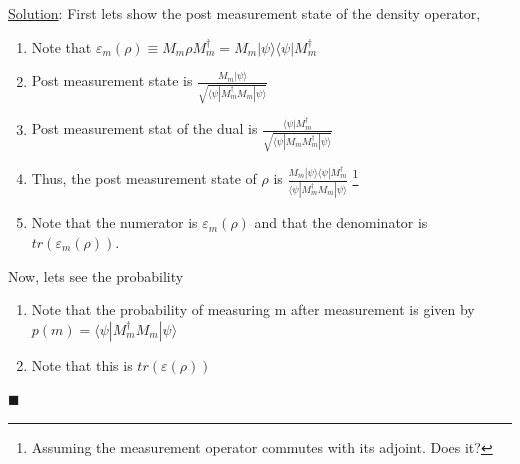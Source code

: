 \documentclass[a4paper,12pt]{amsbook}
\newcommand{\0}{{$|0\rangle$}}
\newcommand{\1}{{$|1\rangle$}}
\begin{document}
\vspace{0.5cm}
\underline{Solution}:
First lets show the post measurement state of the density operator,
\begin{enumerate}

    \item Note that $\varepsilon_m(\rho) \equiv M_m \rho M_m^\dag = M_m |\psi\rangle\langle\psi|M_m^\dag $

    \item Post measurement state is $\frac{M_m |\psi\rangle}{\sqrt{\langle\psi| M_m^\dag M_m |\psi\rangle}}$

    \item Post measurement stat of the dual is  $\frac{\langle \psi | M_m^\dag}{\sqrt{\langle\psi| M_m M_m^\dag |\psi\rangle}}$

    \item Thus, the post measurement state of $\rho$ is $\frac{M_m |\psi\rangle\langle \psi | M_m^\dag}{\langle\psi| M_m^\dag M_m |\psi\rangle}$ \footnote{Assuming the measurement operator commutes with its adjoint. Does it?}

    \item Note that the numerator is $\varepsilon_m(\rho)$ and that the denominator is $tr(\varepsilon_m(\rho))$.
\end{enumerate}

\vspace{0.5cm}
Now, lets see the probability
\begin{enumerate}
    \item Note that the probability of measuring m after measurement is given by $p(m) = \langle\psi| M_m^\dag M_m |\psi\rangle$
    \item Note that this is $tr(\varepsilon(\rho))$
\end{enumerate}
$\blacksquare$
\end{document}
